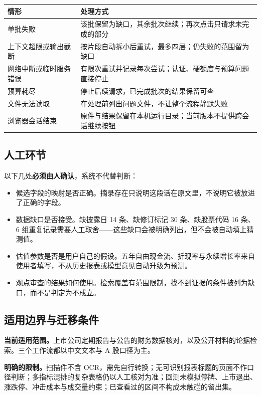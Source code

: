 \documentclass[11pt,a4paper]{ctexart}
\newcommand{\kw}[1]{\textcolor{accent}{\bfseries #1}}
\begin{document}
\begin{tabularx}{\textwidth}{@{}lX@{}}
\toprule
\sffamily\bfseries 情形 & \sffamily\bfseries 处理方式 \\
\midrule
单批失败 & 该批保留为缺口，其余批次继续；再次点击只请求未完成的部分 \\
上下文超限或输出截断 & 按片段自动拆小后重试，最多四层；仍失败的范围留为缺口 \\
网络中断或临时服务错误 & 有限次重试并记录每次尝试；认证、硬额度与预算问题直接停止 \\
预算耗尽 & 停止后续请求，已完成批次的结果保留可查 \\
文件无法读取 & 在处理前列出问题文件，不让整个流程静默失败 \\
浏览器会话结束 & 原件与结果保留在本机运行目录；当前版本不提供跨会话继续按钮 \\
\bottomrule
\end{tabularx}

\subsection{人工环节}

以下几处\kw{必须由人确认}，系统不代替判断：

\begin{itemize}
  \item 候选字段的映射是否正确。摘录存在只说明这段话在原文里，不说明它被放进了正确的字段。
  \item 数据缺口是否接受。缺披露日 14 条、缺修订标记 30 条、缺股票代码 16 条、6 组重复记录需要人工取舍——这些缺口会被明确列出，但不会被自动填上猜测值。
  \item 估值参数是否是用户自己的假设。五年自由现金流、折现率与永续增长率来自使用者填写，不从历史报表或模型意见自动升级为预测。
  \item 观点审查的结果如何使用。检索覆盖有范围限制，找不到证据的条件被列为缺口，而不是判定为不成立。
\end{itemize}

\subsection{适用边界与迁移条件}

\textbf{当前适用范围。}上市公司定期报告与公告的财务数据核对，以及公开材料的论据检索。三个工作流都以中文文本与 A 股口径为主。

\textbf{明确的限制。}扫描件不含 OCR，需先自行转换；无可识别报表标题的页面不作口径判断；多指标混排的复杂表格仍以人工核对为准；回测未模拟停牌、上市退出、涨跌停、冲击成本与成交量约束；已查看过的区间不构成未触碰的留出集。
\end{document}
